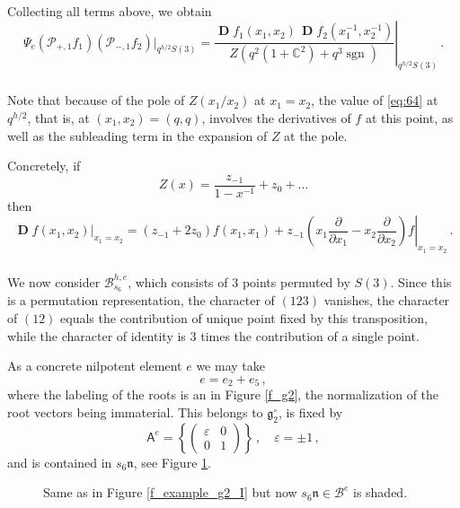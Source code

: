 \documentclass[14pt]{extarticle}
\newcommand{\C}{\mathbb{C}}
\newcommand{\bA}{\mathsf{A}}
\newcommand{\cP}{\mathscr{P}}
\newcommand{\cB}{\mathscr{B}}
\newcommand{\fg}{\mathfrak{g}}
\newcommand{\fn}{\mathfrak{n}}
\DeclareMathOperator{\sgn}{sgn}
\DeclareMathOperator{\DD}{\mathbf{D}}
\theoremstyle{definition}
\begin{document}
Collecting all terms above, we obtain 
%
\begin{equation}
  \Psi_e \left(\cP_{+,1} f_1\right) \left( \cP_{-,1} f_2 \right) \Big|_{q^{h/2} S(3)}=
\left.  \frac{\DD f_1(x_1,x_2) \, \DD  f_2(x_1^{-1},x_2^{-1})}
{Z(q^2(1+\C^2)+q^3\sgn)} \right|_{q^{h/2} S(3)} \,. 
  \label{eq:61}
\end{equation}

\subsubsection{}


Note that because of the pole of $Z(x_1/x_2)$ at $x_1=x_2$,
the value of \eqref{eq:64} at $q^{h/2}$, that is, at
$(x_1,x_2)=(q,q)$, involves the derivatives of $f$ at this point,
as well as the subleading term in the expansion of $Z$ at the pole.

Concretely, if
\[
  Z(x) = \frac{z_{-1}}{1-x^{-1}} + z_0 + \dots
\]
then
\[
  \DD f(x_1,x_2) \Big|_{x_1=x_2} = (z_{-1} + 2 z_0) f(x_1,x_1) +
z_{-1} \left.\left(x_1 \frac{\partial}{\partial x_1} - x_2 \frac{\partial}{\partial
      x_2} \right) f \right|_{x_1=x_2} \,.
\]

\subsubsection{}

We now consider $\cB^{h,e}_{s_6}$, which consists of $3$ points
permuted by $S(3)$. Since this is a permutation representation, the
character of $(123)$ vanishes, the character of $(12)$ 
equals the contribution of unique point fixed by this transposition,
while the character of identity is 3 times the contribution of a
single point. 

As a concrete nilpotent element $e$ we may take
\[
  e = e_2 + e_5 \,,
\]
where the labeling of the roots is an in Figure \ref{f_g2}, the
normalization of the root vectors being immaterial. This
belongs to $\fg_2^\circ$, is fixed by
%
\begin{equation}
  \bA^e=  \left\{
  \begin{pmatrix}
    \varepsilon & 0 \\
    0 & 1
  \end{pmatrix} \right\} \,, \quad \varepsilon = \pm 1\,, 
\label{eq:73_}
\end{equation}
%
and is contained in $s_6 \fn$, see Figure \ref{f_example_g2_II}. 

\begin{figure}[!h]
  \centering
  \def\svgwidth{7.7cm}
  \caption{Same as in Figure \ref{f_example_g2_I} but now $s_6 \fn
    \in \cB^e$ is
    shaded.}
\label{f_example_g2_II}
\end{figure}
\end{document}
